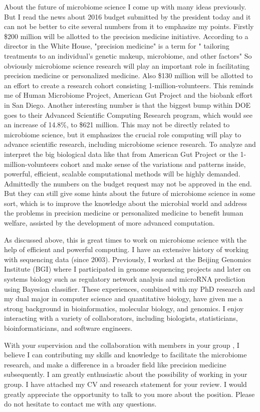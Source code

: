 \documentclass[10pt,a4paper,sans]{moderncv}        %
\begin{document}
About the future of microbiome science I come up with many ideas previously. But I read the news 
about  2016 budget submitted by the president today and it can not be better to cite several numbers
 from it to emphasize my points. Firstly \$200 million will be allotted to the precision medicine 
 initiative. According to a director in the White House, "precision medicine" is a term for " tailoring 
 treatments to an individual's genetic makeup, microbiome, and other factors"  So obviously 
 microbiome science research will play an important role in facilitating precision medicine or 
 personalized medicine.  Also \$130 million will be allotted to an effort to create a research cohort 
 consisting 1-million-volunteers. This reminds me of Human Microbiome Project, American Gut 
 Project and the biobank effort in San Diego. Another interesting number is that the biggest bump 
 within DOE goes to their Advanced Scientific Computing Research program, which would see an 
 increase of 14.8\%, to \$621 million. This may not be directly related to microbiome science, but 
 it emphasizes the crucial role computing will play to advance scientific research, including microbiome
 science research. To analyze and  interpret the big biological data like that from American Gut  Project 
  or the 1-million-volunteers cohort and make sense of 
 the variations and patterns inside, powerful, efficient, scalable computational methods will be 
 highly demanded. Admittedly the numbers on the budget request may not be approved in the end. 
 But they  can still give some hints about the future of microbiome science in some sort, 
 which is to improve the knowledge about the microbial world and address the problems in 
 precision medicine or personalized medicine to benefit human welfare, assisted by the 
 development of more advanced computation.
 
As discussed above, this is great times to work on microbiome science with the help of efficient 
and powerful computing. I have an extensive history of working with sequencing data (since 2003). 
 Previously, I worked at the Beijing Genomics Institute (BGI) where I participated in genome 
 sequencing projects and later on systems biology such as regulatory network analysis and 
 microRNA prediction using Bayesian classifier. These experiences, combined with my PhD research and my dual major
  in computer science and quantitative biology, have given me a strong background in bioinformatics, 
  molecular biology, and genomics.  I enjoy interacting with a variety of collaborators, including 
  biologists, statisticians, bioinformaticians, and software engineers. 
 
With your supervision and the collaboration with members in your group , I believe I can 
contributing my skills and knowledge to facilitate the microbiome  research, and make a 
difference in a broader field like precision medicine subsequently. I am greatly enthusiastic about
 the possibility of working in your group. I have attached my CV and 
research statement for your review. I would greatly appreciate the opportunity to talk to you 
more about the position. Please do not hesitate to contact me with any questions.



\makeletterclosing
\end{document}
